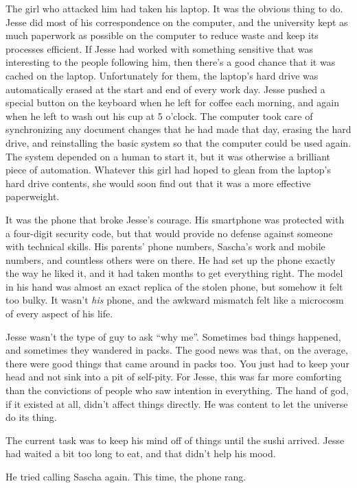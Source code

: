 \documentclass[12pt]{book}
\begin{document}
The girl who attacked him had taken his laptop.  It was the obvious thing to do.  Jesse did most of his correspondence on the computer, and the university kept as much paperwork as possible on the computer to reduce waste and keep its processes efficient.  If Jesse had worked with something sensitive that was interesting to the people following him, then there's a good chance that it was cached on the laptop.  Unfortunately for them, the laptop's hard drive was automatically erased at the start and end of every work day.  Jesse pushed a special button on the keyboard when he left for coffee each morning, and again when he left to wash out his cup at 5 o'clock.  The computer took care of synchronizing any document changes that he had made that day, erasing the hard drive, and reinstalling the basic system so that the computer could be used again.  The system depended on a human to start it, but it was otherwise a brilliant piece of automation.  Whatever this girl had hoped to glean from the laptop's hard drive contents, she would soon find out that it was a more effective paperweight.

It was the phone that broke Jesse's courage.  His smartphone was protected with a four-digit security code, but that would provide no defense against someone with technical skills.  His parents' phone numbers, Sascha's work and mobile numbers, and countless others were on there.  He had set up the phone exactly the way he liked it, and it had taken months to get everything right.  The model in his hand was almost an exact replica of the stolen phone, but somehow it felt too bulky.  It wasn't \emph{his} phone, and the awkward mismatch felt like a microcosm of every aspect of his life.

Jesse wasn't the type of guy to ask ``why me''.  Sometimes bad things happened, and sometimes they wandered in packs.  The good news was that, on the average, there were good things that came around in packs too.  You just had to keep your head and not sink into a pit of self-pity.  For Jesse, this was far more comforting than the convictions of people who saw intention in everything.  The hand of god, if it existed at all, didn't affect things directly.  He was content to let the universe do its thing.

The current task was to keep his mind off of things until the sushi arrived.  Jesse had waited a bit too long to eat, and that didn't help his mood.

He tried calling Sascha again.  This time, the phone rang.
\end{document}
